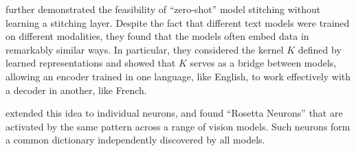 \documentclass{article}
\theoremstyle{plain}
\theoremstyle{definition}
\theoremstyle{remark}
\begin{document}
\citet{moschella2022relative} further demonstrated the feasibility of ``zero-shot'' model stitching without learning a stitching layer.
Despite the fact that different text models were trained on different modalities, they found that the models often
embed data in remarkably similar ways. In particular, they considered the kernel $K$ defined by learned representations and showed that $K$ serves as a bridge between models, allowing an encoder trained in one language, like English, to work effectively with a decoder in another, like French. %

\citet{dravid2023rosetta} extended this idea to individual neurons, and found ``Rosetta Neurons'' that are activated by the same pattern across a range of vision models. Such neurons form a common dictionary independently discovered by all models.



\end{document}
